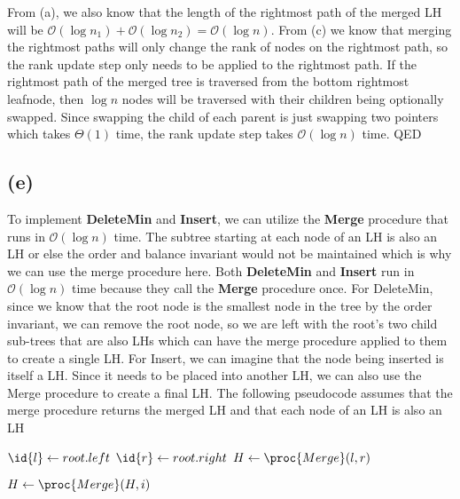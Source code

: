     From (a), we also know that the length of the rightmost path of the merged LH will be $\mathcal{O}(\log{n_1}) + \mathcal{O}(\log{n_2}) = \mathcal{O}(\log{n})$. From (c) we know that merging the rightmost paths will only change the rank of nodes on the rightmost path, so the rank update step only needs to be applied to the rightmost path. If the rightmost path of the merged tree is traversed from the bottom rightmost leafnode, then $\log{n}$ nodes will be traversed with their children being optionally swapped. Since swapping the child of each parent is just swapping two pointers which takes $\Theta(1)$ time, the rank update step takes $\mathcal{O}(\log{n})$ time.
    QED

    \subsection{(e)}
    To implement \textbf{DeleteMin} and \textbf{Insert}, we can utilize the \textbf{Merge} procedure that runs in $\mathcal{O}(\log{n})$ time. The subtree starting at each node of an LH is also an LH or else the order and balance invariant would not be maintained which is why we can use the merge procedure here. Both \textbf{DeleteMin} and \textbf{Insert} run in $\mathcal{O}(\log{n})$ time because they call the \textbf{Merge} procedure once. For DeleteMin, since we know that the root node is the smallest node in the tree by the order invariant, we can remove the root node, so we are left with the root's two child sub-trees that are also LHs which can have the merge procedure applied to them to create a single LH. For Insert, we can imagine that the node being inserted is itself a LH. Since it needs to be placed into another LH, we can also use the Merge procedure to create a final LH.
    The following pseudocode assumes that the merge procedure returns the merged LH and that each node of an LH is also an LH
        \begin{spacing}{1.2}
        \begin{codebox}
        \li $\id{l} \gets root.left$
        \li $\id{r} \gets root.right$
        \li $H \gets \proc{Merge}(l, r)$
        \end{codebox}
        \begin{codebox}
        \li $H \gets \proc{Merge}(H, i)$
        \end{codebox}
        \end{spacing}
        